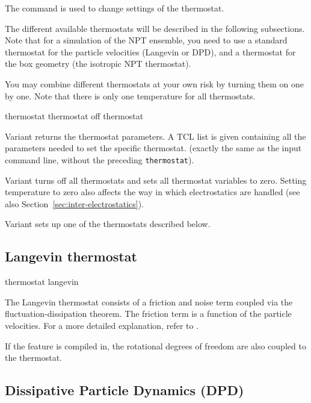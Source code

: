 The  command is used to change settings of the
thermostat.  

The different available thermostats will be described in the following
subsections. Note that for a simulation of the NPT ensemble, you need
to use a standard thermostat for the particle velocities (\eg Langevin
or DPD), and a thermostat for the box geometry (\eg the isotropic NPT
thermostat).

You may combine different thermostats at your own risk by turning them
on one by one. Note that there is only one temperature for all
thermostats.

\begin{essyntax}
   thermostat
   thermostat off
   thermostat 
\end{essyntax}

Variant  returns the thermostat parameters. A TCL list is given containing all
the parameters needed to set the specific thermostat. (exactly the
same as the input command line, without the preceding
\texttt{thermostat}).

Variant  turns off all thermostats and sets all thermostat 
variables to zero. Setting temperature to zero also affects the way in which 
electrostatics are handled (see also Section~\ref{sec:inter-electrostatics}).

Variant  sets up one of the thermostats described below.

\subsection{Langevin thermostat}
\begin{essyntax}
  thermostat langevin  
\end{essyntax}

The Langevin thermostat consists of a friction and noise term coupled
via the fluctuation-dissipation theorem. The friction term is a
function of the particle velocities. For a more detailed explanation,
refer to \cite{berendsen84a, grest86a}.

If the feature  is compiled in, the rotational
degrees of freedom are also coupled to the thermostat.

\subsection{Dissipative Particle Dynamics (DPD) } \label{sec:DPD}

